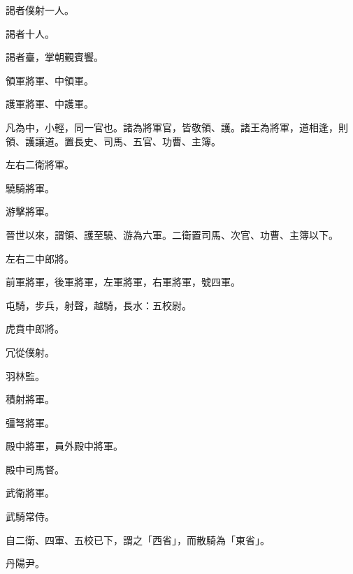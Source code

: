 \begin{pinyinscope}
 謁者僕射一人。



 謁者十人。



 謁者臺，掌朝覲賓饗。



 領軍將軍、中領軍。



 護軍將軍、中護軍。



 凡為中，小輕，同一官也。諸為將軍官，皆敬領、護。諸王為將軍，道相逢，則領、護讓道。置長史、司馬、五官、功曹、主簿。



 左右二衛將軍。



 驍騎將軍。



 游擊將軍。



 晉世以來，謂領、護至驍、游為六軍。二衛置司馬、次官、功曹、主簿以下。



 左右二中郎將。



 前軍將軍，後軍將軍，左軍將軍，右軍將軍，號四軍。



 屯騎，步兵，射聲，越騎，長水：五校尉。



 虎賁中郎將。



 冗從僕射。



 羽林監。



 積射將軍。



 彊弩將軍。



 殿中將軍，員外殿中將軍。



 殿中司馬督。



 武衛將軍。



 武騎常侍。



 自二衛、四軍、五校已下，謂之「西省」，而散騎為「東省」。



 丹陽尹。




\end{pinyinscope}
